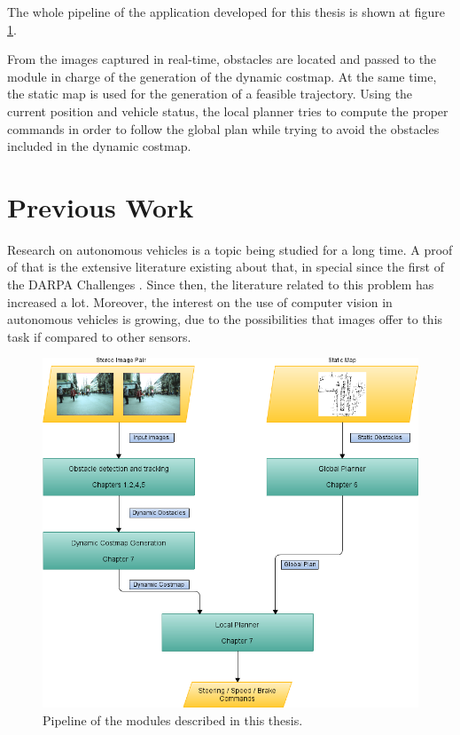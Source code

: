  The whole pipeline of the application developed for this thesis is shown at figure \ref{fig:cp00_pipeline}. 
 

From the images captured in real-time, obstacles are located and passed to the module in charge of the generation of the dynamic costmap. At the same time, the static map is used for the generation of a feasible trajectory. Using the current position and vehicle status, the local planner tries to compute the proper commands in order to follow the global plan while trying to avoid the obstacles included in the dynamic costmap.

\section{Previous Work}\label{ch:chapter00_02}

Research on autonomous vehicles is a topic being studied for a long time. A proof of that is the extensive literature existing about that, in special since the first of the DARPA Challenges \citep{Buehler2007, Buehler2009}. Since then, the literature related to this problem has increased a lot. Moreover, the interest on the use of computer vision in autonomous vehicles is growing, due to the possibilities that images offer to this task if compared to other sensors.

\begin{figure}[h!]
  \centering
  \includegraphics[width=\textwidth,height=\textwidth]{pipeline}
  \caption{Pipeline of the modules described in this thesis.}\label{fig:cp00_pipeline}
\end{figure}

